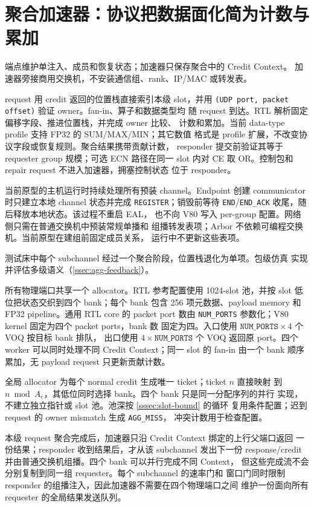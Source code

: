 \section{聚合加速器：协议把数据面化简为计数与累加}
\label{sec:impl-accel}

端点维护单注入、成员和恢复状态；加速器只保存聚合中的 Credit Context。
加速器旁接商用交换机，不安装通信组、rank、IP/MAC 或转发表。

request 用 credit 返回的位置栈直接索引本级 slot，并用
\texttt{(UDP port, packet offset)} 验证 owner。fan-in、算子和数据类型均
随 request 到达。RTL 解析固定偏移字段、推进位置栈，并完成 owner 比较、
计数和累加。当前 data-type profile 支持 FP32 的 SUM/MAX/MIN；其它数值
格式是 profile 扩展，不改变协议字段或恢复规则。聚合结果携带贡献计数，
responder 提交前验证其等于 requester group 规模；可选 ECN 路径在同一
slot 内对 CE 取 OR。控制包和 repair request 不进入加速器，拥塞控制状态
位于 responder。

当前原型的主机运行时持续处理所有预装 channel。Endpoint 创建 communicator
时只建立本地 channel 状态并完成 \texttt{REGISTER}；销毁前等待
\texttt{END}/\texttt{END\_ACK} 收尾，随后释放本地状态。该过程不重启 EAL，
也不向 V80 写入 per-group 配置。网络侧只需在普通交换机中预装常规单播和
组播转发表项；Arbor 不依赖可编程交换机。当前原型在建组前固定成员关系，
运行中不更新这些表项。

测试床中每个 subchannel 经过一个聚合阶段，位置栈退化为单项。包级仿真
实现并评估多级语义（\cref{ssec:agg-feedback}）。

所有物理端口共享一个 allocator。RTL 参考配置使用 1024-slot 池，并按
slot 低位把状态交织到四个 bank；每个 bank 包含 256 项元数据、payload
memory 和 FP32 pipeline。通用 RTL core 的 packet port 数由
\texttt{NUM\_PORTS} 参数化；V80 kernel 固定为四个 packet ports，bank 数
固定为四。入口使用 $\texttt{NUM\_PORTS}\times4$ 个 VOQ 按目标 bank 排队，
出口使用 $4\times\texttt{NUM\_PORTS}$ 个 VOQ 返回原 port。四个 worker
可以同时处理不同 Credit Context；同一 slot 的 fan-in 由一个 bank 顺序
累加，无 payload request 只更新贡献计数。

全局 allocator 为每个 normal credit 生成唯一 ticket；ticket $n$ 直接映射
到 $n\bmod A_e$，其低位同时选择 bank。四个 bank 只是同一分配序列的并行
实现，不建立独立指针或 slot 池。池深按 \cref{sssec:slot-bound} 的循环
复用条件配置；迟到 request 的 owner mismatch 生成 \texttt{AGG\_MISS}，
冲突计数用于检查配置。

本级 request 聚合完成后，加速器只沿 Credit Context 绑定的上行父端口返回
一份结果；responder 收到结果后，才从该 subchannel 发出下一份
response/credit 并由普通交换机组播。四个 bank 可以并行完成不同 Context，
但这些完成流不会分别复制到同一组 requester。每个 subchannel 的速率门和
窗口门同时限制 responder 的组播注入，因此加速器不需要在四个物理端口之间
维护一份面向所有 requester 的全局结果发送队列。

